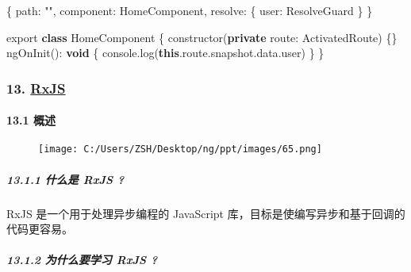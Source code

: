\documentclass[
]{article}
\newenvironment{Shaded}{}{}
\newcommand{\AttributeTok}[1]{\textcolor[rgb]{0.49,0.56,0.16}{#1}}
\newcommand{\BuiltInTok}[1]{#1}
\newcommand{\DataTypeTok}[1]{\textcolor[rgb]{0.56,0.13,0.00}{#1}}
\newcommand{\FunctionTok}[1]{\textcolor[rgb]{0.02,0.16,0.49}{#1}}
\newcommand{\ImportTok}[1]{#1}
\newcommand{\KeywordTok}[1]{\textcolor[rgb]{0.00,0.44,0.13}{\textbf{#1}}}
\newcommand{\NormalTok}[1]{#1}
\newcommand{\OperatorTok}[1]{\textcolor[rgb]{0.40,0.40,0.40}{#1}}
\newcommand{\StringTok}[1]{\textcolor[rgb]{0.25,0.44,0.63}{#1}}
\begin{document}
\begin{Shaded}
\begin{Highlighting}[]
\NormalTok{\{}
   \DataTypeTok{path}\OperatorTok{:} \StringTok{""}\OperatorTok{,}
   \DataTypeTok{component}\OperatorTok{:}\NormalTok{ HomeComponent}\OperatorTok{,}
   \DataTypeTok{resolve}\OperatorTok{:}\NormalTok{ \{}
     \DataTypeTok{user}\OperatorTok{:}\NormalTok{ ResolveGuard}
\NormalTok{   \}}
\NormalTok{\}}
\end{Highlighting}
\end{Shaded}

\begin{Shaded}
\begin{Highlighting}[]
\ImportTok{export} \KeywordTok{class}\NormalTok{ HomeComponent \{}
  \FunctionTok{constructor}\NormalTok{(}\KeywordTok{private} \DataTypeTok{route}\OperatorTok{:}\NormalTok{ ActivatedRoute) \{\}}
  \FunctionTok{ngOnInit}\NormalTok{()}\OperatorTok{:} \KeywordTok{void}\NormalTok{ \{}
    \BuiltInTok{console}\OperatorTok{.}\FunctionTok{log}\NormalTok{(}\KeywordTok{this}\OperatorTok{.}\AttributeTok{route}\OperatorTok{.}\AttributeTok{snapshot}\OperatorTok{.}\AttributeTok{data}\OperatorTok{.}\AttributeTok{user}\NormalTok{)}
\NormalTok{  \}}
\NormalTok{\}}
\end{Highlighting}
\end{Shaded}

\hypertarget{13-rxjs}{%
\subsubsection{\texorpdfstring{13.
\href{https://rxjs.dev/}{RxJS}}{13. RxJS}}\label{13-rxjs}}

\hypertarget{131-ux6982ux8ff0}{%
\paragraph{13.1 概述}\label{131-ux6982ux8ff0}}

\begin{figure}
\centering
\texttt{[image: C:/Users/ZSH/Desktop/ng/ppt/images/65.png]}
\caption{}
\end{figure}

\hypertarget{1311-ux4ec0ux4e48ux662f-rxjs-}{%
\subparagraph{13.1.1 什么是 RxJS
?}\label{1311-ux4ec0ux4e48ux662f-rxjs-}}

RxJS 是一个用于处理异步编程的 JavaScript
库，目标是使编写异步和基于回调的代码更容易。

\hypertarget{1312-ux4e3aux4ec0ux4e48ux8981ux5b66ux4e60-rxjs-}{%
\subparagraph{13.1.2 为什么要学习 RxJS
?}\label{1312-ux4e3aux4ec0ux4e48ux8981ux5b66ux4e60-rxjs-}}
\end{document}
